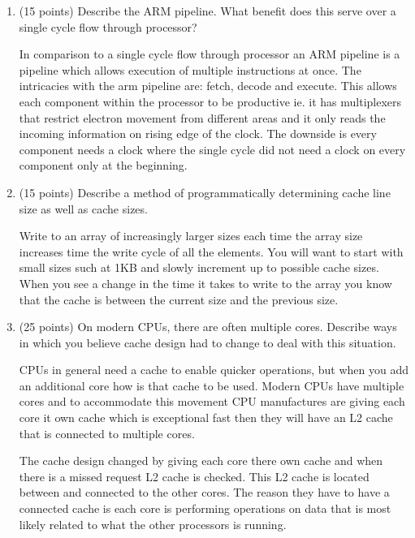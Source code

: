 \documentclass[letterpaper,10pt,onecolumn,titlepage]{article}
\begin{document}
\begin{enumerate}
\item (15 points) Describe the ARM pipeline. What benefit does this serve over a single 
  cycle flow through processor?
\begin{mdframed}[style=MyFrame]
In comparison to a single cycle flow through processor an ARM pipeline is a pipeline which allows execution of multiple instructions at once. The intricacies with the arm pipeline are: fetch, decode and execute. This allows each component within the processor to be productive ie. it has multiplexers that restrict electron movement from different areas and it only reads the incoming information on rising edge of the clock. The downside is every component needs a clock where the single cycle did not need a clock on every component only at the beginning. 
\end{mdframed}

\item (15 points) Describe a method of programmatically determining cache line size as 
  well as cache sizes.
\begin{mdframed}[style=MyFrame]
Write to an array of increasingly larger sizes each time the array size increases time the write cycle of all the elements. You will want to start with small sizes such at 1KB and slowly increment up to possible cache sizes. When you see a change in the time it takes to write to the array you know that the cache is between the current size and the previous size.  
\end{mdframed}

\item (25 points) On modern CPUs, there are often multiple cores. Describe ways in which 
  you believe cache design had to change to deal with this situation.
\begin{mdframed}[style=MyFrame]
CPUs in general need a cache to enable quicker operations, but when you add an additional core how  is that cache to be used. Modern CPUs have multiple cores and to accommodate this movement CPU manufactures are giving each core it own cache which is exceptional fast then they will have an L2 cache that is connected to multiple cores.

The cache design changed by giving each core there own cache and when there is a missed request L2 cache is checked. This L2 cache is located between and connected to the other cores. The reason they have to have a connected cache is each core is performing operations on data that is most likely related to what the other processors is running. 
\end{mdframed}
\end{enumerate}

\newpage


\end{document}
